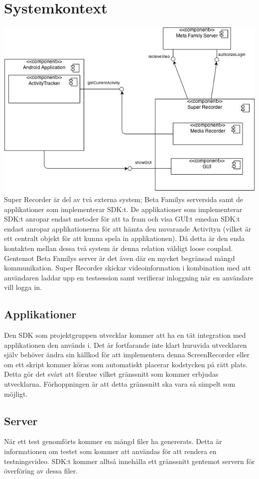 \section{Systemkontext}
\label{sec:system_context}
\includegraphics[width=\linewidth]{UML3.jpg}
Super Recorder är del av två externa system; Beta Familys serversida samt de applikationer som implementerar SDK:t. De applikationer som implementerar SDK:t anropar endast metoder för att ta fram och visa GUI:t emedan SDK:t endast anropar applikationerna för att hämta den nuvarande Activityn (vilket är ett centralt objekt för att kunna spela in applikationen). Då detta är den enda kontakten mellan dessa två system är denna relation väldigt loose couplad. 
Gentemot Beta Familys server är det även där en mycket begränsad mängd kommunikation. Super Recorder skickar videoinformation i kombination med att användaren laddar upp en testsession samt verifierar inloggning när en användare vill logga in. 

\subsection{Applikationer}
Den SDK som projektgruppen utvecklar kommer att ha en tät integration med applikationen den används i. Det är fortfarande inte klart huruvida utvecklaren själv behöver ändra sin källkod för att implementera denna ScreenRecorder eller om ett skript kommer köras som automatiskt placerar kodstycken på rätt plats. Detta gör det svårt att förutse vilket gränssnitt som kommer erbjudas utvecklarna. Förhoppningen är att detta gränssnitt ska vara så simpelt som möjligt.

\subsection{Server}
När ett test genomförts kommer en mängd filer ha genererats. Detta är informationen om testet som kommer att användas för att rendera en testningsvideo. SDK:t kommer alltså innehålla ett gränssnitt gentemot servern för överföring av dessa filer. 